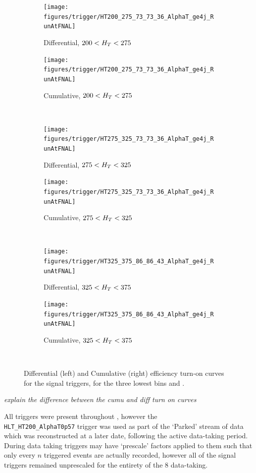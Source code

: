 \begin{figure}[!ht]
  \centering
    
    \begin{subfigure}[b]{0.48\textwidth}
      \texttt{[image: figures/trigger/HT200\_275\_73\_73\_36\_AlphaT\_ge4j\_RunAtFNAL]}
      \caption{Differential, $200 < H_T < 275 $\gev}
    \end{subfigure}
    \begin{subfigure}[b]{0.48\textwidth}
      \texttt{[image: figures/trigger/HT200\_275\_73\_73\_36\_AlphaT\_ge4j\_RunAtFNAL]}
      \caption{Cumulative, $200 < H_T < 275 $\gev}
    \end{subfigure} \\
    \begin{subfigure}[b]{0.48\textwidth}
      \texttt{[image: figures/trigger/HT275\_325\_73\_73\_36\_AlphaT\_ge4j\_RunAtFNAL]}
      \caption{Differential, $275 < H_T < 325 $\gev}
    \end{subfigure}
    \begin{subfigure}[b]{0.48\textwidth}
      \texttt{[image: figures/trigger/HT275\_325\_73\_73\_36\_AlphaT\_ge4j\_RunAtFNAL]}
      \caption{Cumulative, $275 < H_T < 325 $\gev}
    \end{subfigure} \\
    \begin{subfigure}[b]{0.48\textwidth}
      \texttt{[image: figures/trigger/HT325\_375\_86\_86\_43\_AlphaT\_ge4j\_RunAtFNAL]}
      \caption{Differential, $325 < H_T < 375 $\gev}
    \end{subfigure}
    \begin{subfigure}[b]{0.48\textwidth}
      \texttt{[image: figures/trigger/HT325\_375\_86\_86\_43\_AlphaT\_ge4j\_RunAtFNAL]}
      \caption{Cumulative, $325 < H_T < 375 $\gev}
    \end{subfigure} \\
  
    \caption{\label{fig:eff_alphat_ge4j}
      Differential (left) and Cumulative (right) efficiency turn-on curves for 
      the signal triggers, for the three lowest \HT bins and \njhigh.}
\end{figure}

\emph{explain the difference between the cumu and diff turn on curves}

All triggers were present throughout \runone, however the 
\\\verb!HLT_HT200_AlphaT0p57! trigger was used as part of the `Parked' stream of 
data which was reconstructed at a later date, following the active data-taking 
period. During data taking triggers may have `prescale' factors applied to them 
such that only every $n$ triggered events are actually recorded, however all of
the signal triggers remained unprescaled for the entirety of the 8\tev
data-taking.


